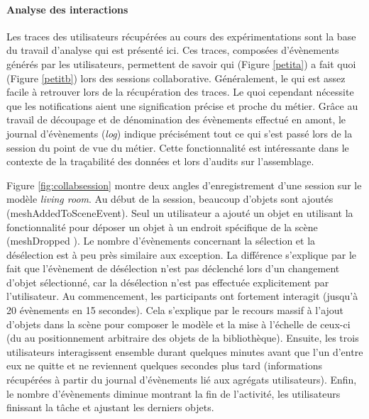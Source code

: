 \paragraph{Analyse des interactions}
Les traces des utilisateurs récupérées au cours des expérimentations sont la base 
du travail d'analyse qui est présenté ici. Ces traces, composées d'évènements 
générés par les utilisateurs, permettent de savoir qui (Figure \ref{petita}) a fait quoi 
(Figure \ref{petitb}) lors des sessions collaborative. Généralement, le \og qui\fg{} 
est assez facile à retrouver lors de la récupération des traces. Le \og quoi\fg{} 
cependant nécessite que les notifications aient une signification précise et proche 
du métier. Grâce au travail de découpage et de dénomination des évènements 
effectué en amont, le journal d'évènements (\textit{log}) indique précisément tout 
ce 
qui s'est passé lors de la session du point de vue du métier. Cette fonctionnalité 
est 
intéressante dans le contexte de la traçabilité des données et lors d'audits sur 
l'assemblage. 

Figure \ref{fig:collabsession} montre deux angles d'enregistrement d'une session 
sur le modèle \textit{living room}. Au début de la session, beaucoup d'objets sont 
ajoutés (meshAddedToSceneEvent). Seul un utilisateur a ajouté un objet en 
utilisant la fonctionnalité pour déposer un objet à un endroit spécifique de la scène 
(meshDropped ). Le nombre d'évènements concernant la sélection et 
la désélection est à peu près similaire aux exception. La différence s'explique par 
le fait que l'évènement de désélection n'est pas déclenché lors d'un changement 
d'objet sélectionné, car la désélection n'est pas effectuée explicitement par 
l'utilisateur. Au commencement, les participants ont fortement interagit (jusqu'à 20 
évènements en 15 secondes). Cela s'explique par le recours massif à l'ajout 
d'objets dans la scène pour composer le modèle et la mise à l'échelle de ceux-ci 
(du au positionnement arbitraire des objets de la bibliothèque). Ensuite, les trois 
utilisateurs interagissent ensemble durant quelques minutes avant que l'un d'entre 
eux ne quitte et ne reviennent quelques secondes plus tard (informations 
récupérées à partir du journal d'évènements lié aux agrégats utilisateurs). Enfin, le 
nombre d'évènements diminue montrant la fin de l'activité, les utilisateurs finissant 
la tâche et ajustant les derniers objets.

